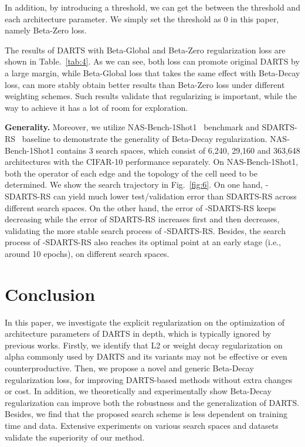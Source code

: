 \documentclass[10pt,twocolumn,letterpaper]{article}
\begin{document}
In addition, by introducing a threshold, we can get the  between the threshold and each architecture parameter. We simply set the threshold as 0 in this paper, namely Beta-Zero loss.


The results of DARTS with Beta-Global and Beta-Zero regularization loss are shown in Table.~\ref{tab:4}. As we can see, both loss can promote original DARTS by a large margin, while Beta-Global loss that takes the same effect with Beta-Decay loss, can more stably obtain better results than Beta-Zero loss under different weighting schemes. Such results validate that regularizing  is important, while the way to achieve it has a lot of room for exploration.



\noindent\textbf{Generality.} Moreover, we utilize NAS-Bench-1Shot1~\cite{1shot1} benchmark and SDARTS-RS~\cite{sdarts} baseline to demonstrate the generality of Beta-Decay regularization. NAS-Bench-1Shot1 contains 3 search spaces, which consist of 6,240, 29,160 and 363,648 architectures with the CIFAR-10 performance separately. On NAS-Bench-1Shot1, both the operator of each edge and the topology of the cell need to be determined. 
We show the search trajectory in Fig.~\ref{fig:6}. On one hand, -SDARTS-RS can yield much lower test/validation error than SDARTS-RS across different search spaces. On the other hand, the error of -SDARTS-RS keeps decreasing while the error of SDARTS-RS increases first and then decreases, validating the more stable search process of -SDARTS-RS. Besides, the search process of -SDARTS-RS also reaches its optimal point at an early stage (i.e., around 10 epochs), on different search spaces.

\section{Conclusion} \label{sec:Con}
In this paper, we investigate the explicit regularization on the optimization of architecture parameters of DARTS in depth, which is typically ignored by previous works. Firstly, we identify that L2 or weight decay regularization on alpha commonly used by DARTS and its variants may not be effective or even counterproductive. Then, we propose a novel and generic Beta-Decay regularization loss, for improving DARTS-based methods without extra changes or cost. In addition, we theoretically and experimentally show Beta-Decay regularization can improve both the robustness and the generalization of DARTS. Besides, we find that the proposed search scheme is less dependent on training time and data. Extensive experiments on various search spaces and datasets validate the superiority of our method.

{\small


}
\end{document}
